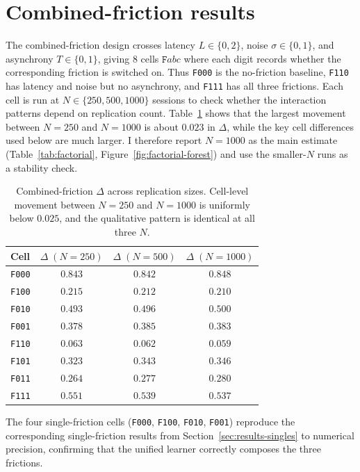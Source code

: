 \section{Combined-friction results}
\label{sec:results-factorial}

The combined-friction design crosses latency $L\in\{0,2\}$, noise $\sigma\in\{0,1\}$, and asynchrony $T\in\{0,1\}$, giving 8 cells $\texttt{F}abc$ where each digit records whether the corresponding friction is switched on. Thus \texttt{F000} is the no-friction baseline, \texttt{F110} has latency and noise but no asynchrony, and \texttt{F111} has all three frictions. Each cell is run at $N\in\{250,500,1000\}$ sessions to check whether the interaction patterns depend on replication count. Table~\ref{tab:factorial-acrossN} shows that the largest movement between $N=250$ and $N=1000$ is about $0.023$ in $\Delta$, while the key cell differences used below are much larger. I therefore report $N=1000$ as the main estimate (Table~\ref{tab:factorial}, Figure~\ref{fig:factorial-forest}) and use the smaller-$N$ runs as a stability check.

\begin{table}[H]
\centering
\caption{Combined-friction $\Delta$ across replication sizes. Cell-level movement between $N=250$ and $N=1000$ is uniformly below $0.025$, and the qualitative pattern is identical at all three $N$.}
\label{tab:factorial-acrossN}
\renewcommand{\arraystretch}{1.05}
\begin{tabular}{lccc}
\toprule
Cell & $\Delta\;(N{=}250)$ & $\Delta\;(N{=}500)$ & $\Delta\;(N{=}1000)$ \\
\midrule
\texttt{F000} & $0.843$ & $0.842$ & $0.848$ \\
\texttt{F100} & $0.215$ & $0.212$ & $0.210$ \\
\texttt{F010} & $0.493$ & $0.496$ & $0.500$ \\
\texttt{F001} & $0.378$ & $0.385$ & $0.383$ \\
\texttt{F110} & $0.063$ & $0.062$ & $0.059$ \\
\texttt{F101} & $0.323$ & $0.343$ & $0.346$ \\
\texttt{F011} & $0.264$ & $0.277$ & $0.280$ \\
\texttt{F111} & $0.551$ & $0.539$ & $0.537$ \\
\bottomrule
\end{tabular}
\end{table}

The four single-friction cells (\texttt{F000}, \texttt{F100}, \texttt{F010}, \texttt{F001}) reproduce the corresponding single-friction results from Section~\ref{sec:results-singles} to numerical precision, confirming that the unified learner correctly composes the three frictions.

